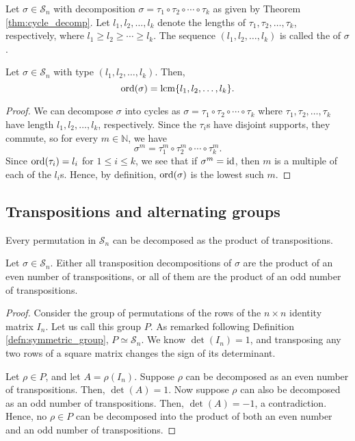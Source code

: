 \begin{defn}
Let $ \sigma\in\mathcal{S}_n $ with decomposition $ \sigma=\tau_1\circ\tau_2\circ\cdots\circ\tau_k $ as given by Theorem \ref{thm:cycle_decomp}. Let $ l_1,l_2,\ldots,l_k $ denote the lengths of $ \tau_1,\tau_2,\ldots,\tau_k $, respectively, where $ l_1\geq l_2\geq\cdots\geq l_k $. The sequence $ (l_1,l_2,\ldots,l_k) $ is called the  of $ \sigma $.
\end{defn}

\begin{prop}
Let $ \sigma\in\mathcal{S}_n $ with type $ (l_1,l_2,\ldots,l_k) $. Then,
\begin{equation*}
    \operatorname{ord}(\sigma)=\operatorname{lcm}\{l_1,l_2,\ldots,l_k\}.
\end{equation*}
\end{prop}
\begin{proof}
We can decompose $ \sigma $ into cycles as $ \sigma=\tau_1\circ\tau_2\circ\cdots\circ\tau_k $ where $ \tau_1,\tau_2,\ldots,\tau_k $ have length $ l_1,l_2,\ldots,l_k $, respectively. Since the $ \tau_i $s have disjoint supports, they commute, so for every $ m\in\mathbb{N} $, we have
\begin{equation*}
    \sigma^m=\tau_1^m\circ\tau_2^m\circ\cdots\circ\tau_k^m.
\end{equation*}
Since $ \operatorname{ord}(\tau_i)=l_i $ for $ 1\leq i\leq k $, we see that if $ \sigma^m=\operatorname{id} $, then $ m $ is a multiple of each of the $ l_i $s. Hence, by definition, $ \operatorname{ord}(\sigma) $ is the lowest such $ m $.
\end{proof}

\subsection*{Transpositions and alternating groups}

\begin{cor}
Every permutation in $ \mathcal{S}_n $ can be decomposed as the product of transpositions.
\end{cor}

\begin{prop}
Let $ \sigma\in\mathcal{S}_n $. Either all transposition decompositions of $ \sigma $ are the product of an even number of transpositions, or all of them are the product of an odd number of transpositions.
\end{prop}
\begin{proof}
Consider the group of permutations of the rows of the $ n\times n $ identity matrix $ I_n $. Let us call this group $ P $. As remarked following Definition \ref{defn:symmetric_group}, $ P\simeq\mathcal{S}_n $. We know $ \det(I_n)=1 $, and transposing any two rows of a square matrix changes the sign of its determinant.

Let $ \rho\in P $, and let $ A=\rho(I_n) $. Suppose $ \rho $ can be decomposed as an even number of transpositions. Then, $ \det(A)=1 $. Now suppose $ \rho $ can also be decomposed as an odd number of transpositions. Then, $ \det(A)=-1 $, a contradiction. Hence, no $ \rho\in P $ can be decomposed into the product of both an even number and an odd number of transpositions.
\end{proof}

